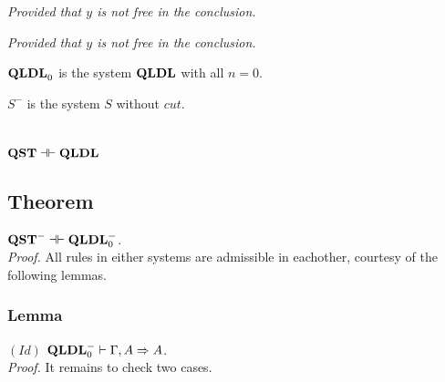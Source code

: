 \documentclass[a4paper, 12pt]{paper}
\begin{document}
\begin{multicols}{2}
  \begin{prooftree}
  \end{prooftree}
  \columnbreak
  \begin{prooftree}
  \end{prooftree}
  \center
  \emph{Provided that $y$ is not free in the conclusion.}
\end{multicols}\vspace*{1em}
\begin{multicols}{2}
  \begin{prooftree}
  \end{prooftree}
  \center
  \emph{Provided that $y$ is not free in the conclusion.}
  \columnbreak
  \begin{prooftree}
  \end{prooftree}
\end{multicols}

$\qldl_0$ is the system $\qldl$ with all $n = 0$.

$S^-$ is the system $S$ without $cut$.

\section{$\qst \dashv \vdash \qldl$}

\subsection{Theorem} $\qst^- \dashv \vdash \qldl_0^-$.\\
\emph{Proof.} All rules in either systems are admissible in eachother, courtesy of the following lemmas.

\subsubsection{Lemma} $(Id)$ $\qldl_0^- \vdash \Gamma, A \Rightarrow A$.\\
\emph{Proof.} It remains to check two cases.
\end{document}
